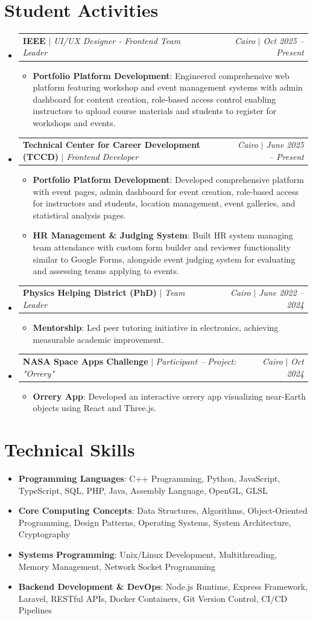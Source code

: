 \documentclass[letterpaper,11pt]{article}
\makeatletter
\newcommand{\resumeItem}[2]{\item\small{\textbf{#1}{: #2 \vspace{-2pt}}}}
\newcommand{\resumeActivitySubheading}[4]{
  \vspace{-1pt}\item
    \begin{tabular*}{0.97\textwidth}{l@{\extracolsep{\fill}}r}
      \textbf{#1} $|$ \textit{\small#3} & \textit{\small#2} $|$ \textit{\small #4} \\
    \end{tabular*}\vspace{-5pt}
}
\newcommand{\resumeSubHeadingListStart}{\begin{itemize}[leftmargin=*]}
\newcommand{\resumeSubHeadingListEnd}{\end{itemize}}
\newcommand{\resumeItemListStart}{\begin{itemize}}
\newcommand{\resumeItemListEnd}{\end{itemize}\vspace{-5pt}}
\makeatother
\begin{document}
\section{Student Activities}
  \resumeSubHeadingListStart
    \resumeActivitySubheading
      {IEEE}{Cairo}{UI/UX Designer - Frontend Team Leader}{Oct 2025 -- Present}
      \resumeItemListStart
        \resumeItem{Portfolio Platform Development}
          {Engineered comprehensive web platform featuring workshop and event management systems with admin dashboard for content creation, role-based access control enabling instructors to upload course materials and students to register for workshops and events.}
      \resumeItemListEnd
    \vspace{4pt}
    \resumeActivitySubheading
      {Technical Center for Career Development (TCCD)}{Cairo}{Frontend Developer}{June 2025 -- Present}
      \resumeItemListStart
        \resumeItem{Portfolio Platform Development}
          {Developed comprehensive platform with event pages, admin dashboard for event creation, role-based access for instructors and students, location management, event galleries, and statistical analysis pages.}
        \resumeItem{HR Management \& Judging System}
          {Built HR system managing team attendance with custom form builder and reviewer functionality similar to Google Forms, alongside event judging system for evaluating and assessing teams applying to events.}
      \resumeItemListEnd
    \vspace{4pt}
    \resumeActivitySubheading
      {Physics Helping District (PhD)}{Cairo}{Team Leader}{June 2022 -- 2024}
      \resumeItemListStart
        \resumeItem{Mentorship}
          {Led peer tutoring initiative in electronics, achieving measurable academic improvement.}
      \resumeItemListEnd
    \vspace{4pt}
    \resumeActivitySubheading
      {NASA Space Apps Challenge}{Cairo}{Participant -- Project: "Orrery"}{Oct 2024}
      \resumeItemListStart
        \resumeItem{Orrery App}
          {Developed an interactive orrery app visualizing near-Earth objects using React and Three.js.}
      \resumeItemListEnd
  \resumeSubHeadingListEnd
\section{Technical Skills}
 \resumeSubHeadingListStart
    \item{\textbf{Programming Languages}{: C++ Programming, Python, JavaScript, TypeScript, SQL, PHP, Java, Assembly Language, OpenGL, GLSL}}
    \item{\textbf{Core Computing Concepts}{: Data Structures, Algorithms, Object-Oriented Programming, Design Patterns, Operating Systems, System Architecture, Cryptography}}
    \item{\textbf{Systems Programming}{: Unix/Linux Development, Multithreading, Memory Management, Network Socket Programming}}
    \item{\textbf{Backend Development \& DevOps}{: Node.js Runtime, Express Framework, Laravel, RESTful APIs, Docker Containers, Git Version Control, CI/CD Pipelines}}
 \resumeSubHeadingListEnd
\end{document}

